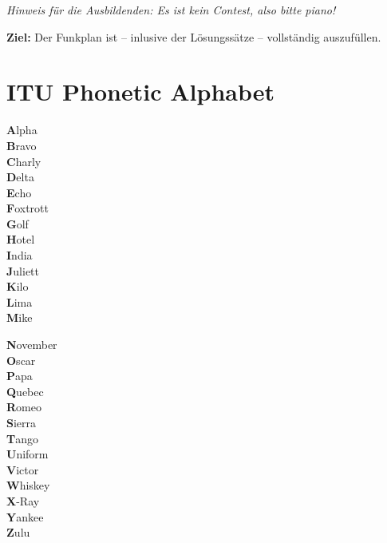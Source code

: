 \documentclass[a4paper,10pt]{article}
\begin{document}
\begin{center}
  \textit{Hinweis für die Ausbildenden: Es ist kein Contest, also
bitte piano!}
\end{center}

\textbf{Ziel:} Der Funkplan ist -- inlusive der Lösungssätze -- vollständig
auszufüllen.

\section{ITU Phonetic Alphabet}

\begin{minipage}[t]{0.5\textwidth}
  \large
  \textbf{A}lpha\\
  \textbf{B}ravo\\
  \textbf{C}harly\\
  \textbf{D}elta\\
  \textbf{E}cho\\
  \textbf{F}oxtrott\\
  \textbf{G}olf\\
  \textbf{H}otel\\
  \textbf{I}ndia\\
  \textbf{J}uliett\\
  \textbf{K}ilo\\
  \textbf{L}ima\\
  \textbf{M}ike\\
\end{minipage}
\begin{minipage}[t]{0.5\textwidth}
  \large
  \textbf{N}ovember\\
  \textbf{O}scar\\
  \textbf{P}apa\\
  \textbf{Q}uebec\\
  \textbf{R}omeo\\
  \textbf{S}ierra\\
  \textbf{T}ango\\
  \textbf{U}niform\\
  \textbf{V}ictor\\
  \textbf{W}hiskey\\
  \textbf{X}-Ray\\
  \textbf{Y}ankee\\
  \textbf{Z}ulu\\
\end{minipage}
\end{document}

